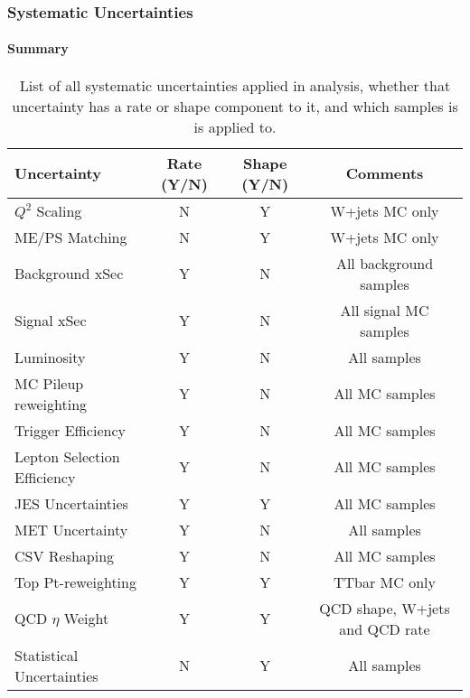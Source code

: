 \begin{frame}
	\frametitle{Systematic Uncertainties}
	\framesubtitle{Summary}
	\vspace*{-0.24cm}

	\begin{table}[htbp]
		\centering
		\scriptsize
		\begin{tabular}{|l|c|c|c|}
			\hline\hline
			Uncertainty & Rate (Y/N) & Shape (Y/N) & Comments \\
			\hline
			$Q^{2}$ Scaling & N & Y & W+jets MC only \\ \hline
			ME/PS Matching & N & Y & W+jets MC only \\ \hline
			Background xSec & Y & N & All background samples \\  \hline
			Signal xSec & Y & N & All signal MC samples \\  \hline
			Luminosity & Y & N & All samples \\  \hline
			MC Pileup reweighting & Y & N & All MC samples \\  \hline
			Trigger Efficiency & Y & N &  All MC samples\\  \hline
			Lepton Selection Efficiency & Y & N & All MC samples\\  \hline
			JES Uncertainties & Y & Y & All MC samples \\  \hline
			MET Uncertainty & Y & N & All samples\\  \hline
			CSV Reshaping & Y & N &  All MC samples\\  \hline
			Top Pt-reweighting & Y & Y &  TTbar MC only\\  \hline
			QCD $\eta$ Weight & Y & Y & QCD shape, W+jets and QCD rate \\   \hline
			Statistical Uncertainties & N & Y & All samples \\
			\hline\hline
		\end{tabular}
		\caption{List of all systematic uncertainties applied in analysis, whether that uncertainty has a rate or shape component to it, 	and which samples is is applied to.}
		\label{tab:ListOfSystematics}
	\end{table}
\end{frame}

